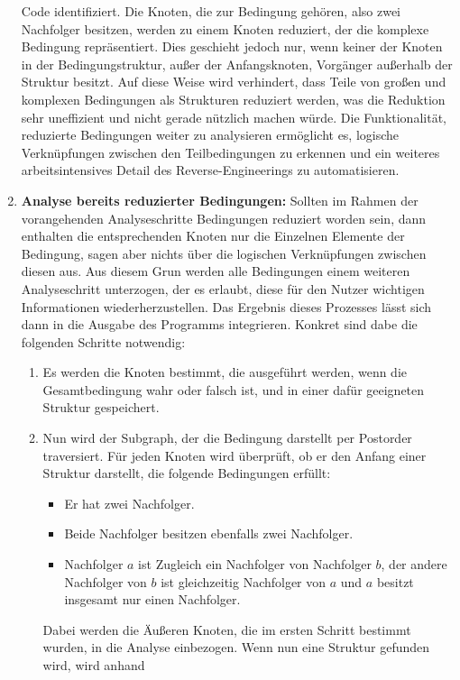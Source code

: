 \documentclass[11pt]{article}
\begin{document}
\begin{enumerate}
		Code identifiziert. Die Knoten, die zur Bedingung gehören, also zwei Nachfolger
		besitzen, werden zu einem Knoten reduziert, der die komplexe Bedingung repräsentiert.
		Dies geschieht jedoch nur, wenn keiner der Knoten in der Bedingungstruktur,
		außer der Anfangsknoten, Vorgänger außerhalb der Struktur besitzt.
		Auf diese Weise wird verhindert, dass Teile von großen und komplexen Bedingungen
		als Strukturen reduziert werden, was die Reduktion sehr uneffizient und nicht
		gerade nützlich machen würde. Die Funktionalität, reduzierte Bedingungen weiter
		zu analysieren ermöglicht es, logische Verknüpfungen zwischen den Teilbedingungen
		zu erkennen und ein weiteres arbeitsintensives Detail des Reverse-Engineerings
		zu automatisieren.
	\item{\textbf{Analyse bereits reduzierter Bedingungen:}}
		Sollten im Rahmen der vorangehenden Analyseschritte Bedingungen reduziert worden sein,
		dann enthalten die entsprechenden Knoten nur die Einzelnen Elemente der Bedingung,
		sagen aber nichts über die logischen Verknüpfungen zwischen diesen aus. Aus diesem
		Grun werden alle Bedingungen einem weiteren Analyseschritt unterzogen, der es erlaubt,
		diese für den Nutzer wichtigen Informationen wiederherzustellen. Das Ergebnis dieses
		Prozesses lässt sich dann in die Ausgabe des Programms integrieren. Konkret sind dabe
		die folgenden Schritte notwendig:
		\begin{enumerate}
			\item{Es werden die Knoten bestimmt, die ausgeführt werden, wenn die Gesamtbedingung
				wahr oder falsch ist, und in einer dafür geeigneten Struktur gespeichert.}
			\item{Nun wird der Subgraph, der die Bedingung darstellt per Postorder traversiert.
				Für jeden Knoten wird überprüft, ob er den Anfang einer Struktur darstellt,
				die folgende Bedingungen erfüllt:
				\begin{itemize}
					\item{Er hat zwei Nachfolger.}
					\item{Beide Nachfolger besitzen ebenfalls zwei Nachfolger.}
					\item{Nachfolger $a$ ist Zugleich ein Nachfolger von
						Nachfolger $b$, der andere Nachfolger von $b$ ist
						gleichzeitig Nachfolger von $a$ und $a$ besitzt insgesamt
					        nur einen Nachfolger.}
				\end{itemize}
				Dabei werden die Äußeren Knoten, die im ersten Schritt bestimmt wurden, in
				die Analyse einbezogen. Wenn nun eine Struktur gefunden wird, wird anhand
}
\end{enumerate}
\end{enumerate}
\end{document}
